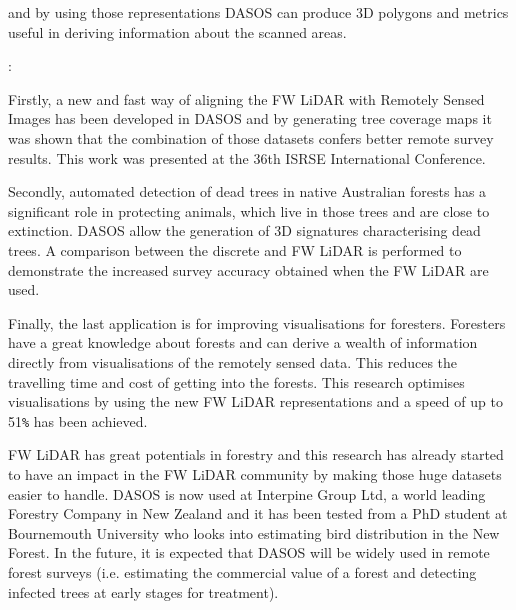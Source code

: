 \documentclass{subfiles}
\begin{document}
\par 

and by using those representations DASOS can produce 3D polygons and metrics useful in deriving information about the scanned areas.

\par :

\par Firstly, a new and fast way of aligning the FW LiDAR with Remotely Sensed Images has been developed in DASOS and by generating tree coverage maps it was shown that the combination of those datasets confers better remote survey results.  This work was presented at the 36th ISRSE International Conference. 

\par Secondly, automated detection of dead trees in native Australian forests has a significant role in protecting animals, which live in those trees and are close to extinction. DASOS allow the generation of 3D signatures characterising dead trees. A comparison between the discrete and FW LiDAR is performed to demonstrate the increased survey accuracy obtained when the FW LiDAR are used. 

\par Finally, the last application is for improving visualisations for foresters. Foresters have a great knowledge about forests and can derive a wealth of information directly from visualisations of the remotely sensed data. This reduces the travelling time and cost of getting into the forests. This research optimises visualisations by using the new FW LiDAR representations and a speed of up to 51\verb|%| has been achieved.

\par FW LiDAR has great potentials in forestry and this research has already started to have an impact in the FW LiDAR community by making those huge datasets easier to handle. DASOS is now used at Interpine Group Ltd, a world leading Forestry Company in New Zealand and it has been tested from a PhD student at Bournemouth University who looks into estimating bird distribution in the New Forest. In the future, it is expected that DASOS will be widely used in remote forest surveys (i.e. estimating the commercial value of a forest and detecting infected trees at early stages for treatment). 
\end{document}
